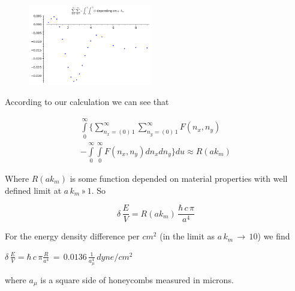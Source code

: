 \documentclass[twoside, 10pt]{article}
\begin{document}
\begin{multicols}{2}
\begin{figure}
\includegraphics[width=0.48\textwidth]{sum_sum_int_int_G_on_a_km.png}
\caption{}{}
\label{fig:G_on_a_km}
\end{figure}

    According to our calculation we can see that

\begin{equation}
\begin{array}{l}
    \int\limits_{0}^{\infty} \Bigg\{ \sum\limits_{n_x=\left(0\right)\,1}^{\infty} \sum\limits_{n_y=\left(0\right)\,1}^{\infty} F\left(n_x, n_y\right) \\
- \int\limits_{0}^{\infty} \int\limits_{0}^{\infty} F\left(n_x, n_y\right) d{n_x} d{n_y} \Bigg\} d{u} \approx R\left(a k_m\right)
\end{array}
\end{equation}



    Where \(R\left(a k_m\right)\) is some function depended on material
properties with well defined limit at \(a\,k_m\,»\,1\). So

    \begin{equation}
\delta\,\frac{E}{V} = R\left(a k_m\right)\,\frac{\hbar\,c\,\pi}{a^4}
\end{equation}

    For the energy density difference per \(cm^2\) (in the limit as
\(a\,k_m\,\rightarrow \,10\)) we find

    \(\delta\,\frac{E}{V} = \hbar\,c\, \pi\frac{R}{a^4}\,=\,0.0136\,\frac{1}{a_{\mu}^4}\,dyne/cm^2\)

    where \(a_{\mu}\) is a square side of honeycombs measured in microns.



\end{multicols}
\end{document}
